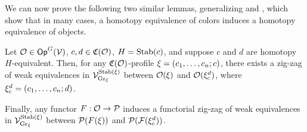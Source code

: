 \documentclass[a4paper,10pt
,draft
]{article}%
\renewcommand{\F}{\mathcal F}
\renewcommand{\1}{\ensuremath{\mathbb{id}}}
\begin{document}
We can now prove the following two similar lemmas, generalizing \cite[Prop. 4.14]{Cav14} and \cite[Prop. 2.12]{BM13},
which show that in many cases, a homotopy equivalence of colors induces a homotopy equivalence of objects.

\begin{lemma}
      \label{CAV_4.14_PROP1}
      Let $\mathcal{O} \in \mathsf{Op}^G(\mathcal V)$,
      $c,d \in \mathfrak C(\mathcal{O})$, 
      $H = \mathrm{Stab}(c)$, and suppose $c$ and $d$ are homotopy $H$-equivalent.
      Then, for any $\mathfrak C(\mathcal{O})$-profile $\xi = (c_1,\dots, c_n;c)$,
      there exists a zig-zag of weak equivalences in $\mathcal V^{\mathrm{Stab}(\xi)}_{\mathrm{Gr}_\xi}$
      between $\mathcal{O}(\xi)$ and $\mathcal{O}(\xi_c^d)$,
      where $\xi_c^d = (c_1,\dots, c_n;d)$.

      Finally, any functor $F: \mathcal{O} \to \mathcal{P}$ induces a functorial zig-zag of weak equivalences in $\mathcal V^{\mathrm{Stab}(\xi)}_{\mathrm{Gr}_\xi}$
      between $\mathcal{P}(F(\xi))$ and $\P(\F(\ksi_c^d))$.
\end{lemma}
\end{document}
